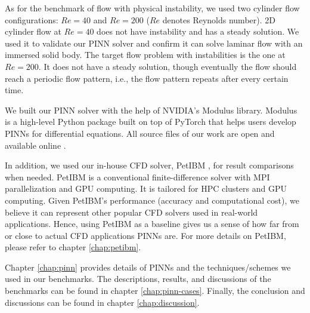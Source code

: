 As for the benchmark of flow with physical instability, we used two cylinder flow configurations: $Re=40$ and $Re=200$ ($Re$ denotes Reynolds number).
2D cylinder flow at $Re=40$ does not have instability and has a steady solution.
We used it to validate our PINN solver and confirm it can solve laminar flow with an immersed solid body.
The target flow problem with instabilities is the one at $Re=200$.
It does not have a steady solution, though eventually the flow should reach a periodic flow pattern, i.e., the flow pattern repeats after every certain time.

We built our PINN solver with the help of NVIDIA's Modulus library.
Modulus is a high-level Python package built on top of PyTorch that helps users develop PINNs for differential equations.
All source files of our work are open and available online \cite{chuang_dissertation_nodate}.

In addition, we used our in-house CFD solver, PetIBM \cite{chuang_petibm:_2018}, for result comparisons when needed.
PetIBM is a conventional finite-difference solver with MPI parallelization and GPU computing.
It is tailored for HPC clusters and GPU computing.
Given PetIBM's performance (accuracy and computational cost), we believe it can represent other popular CFD solvers used in real-world applications.
Hence, using PetIBM as a baseline gives us a sense of how far from or close to actual CFD applications PINNs are.
For more details on PetIBM, please refer to chapter \ref{chap:petibm}.

Chapter \ref{chap:pinn} provides details of PINNs and the techniques/schemes we used in our benchmarks.
The descriptions, results, and discussions of the benchmarks can be found in chapter \ref{chap:pinn-cases}.
Finally, the conclusion and discussions can be found in chapter \ref{chap:discussion}.

